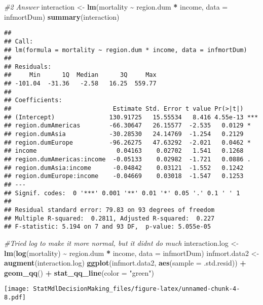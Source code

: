 \documentclass[
]{article}
\newenvironment{Shaded}{\begin{snugshade}}{\end{snugshade}}
\newcommand{\AttributeTok}[1]{\textcolor[rgb]{0.13,0.29,0.53}{#1}}
\newcommand{\CommentTok}[1]{\textcolor[rgb]{0.56,0.35,0.01}{\textit{#1}}}
\newcommand{\FunctionTok}[1]{\textcolor[rgb]{0.13,0.29,0.53}{\textbf{#1}}}
\newcommand{\NormalTok}[1]{#1}
\newcommand{\OtherTok}[1]{\textcolor[rgb]{0.56,0.35,0.01}{#1}}
\newcommand{\SpecialCharTok}[1]{\textcolor[rgb]{0.81,0.36,0.00}{\textbf{#1}}}
\newcommand{\StringTok}[1]{\textcolor[rgb]{0.31,0.60,0.02}{#1}}
\begin{document}
\begin{Shaded}
\begin{Highlighting}[]
\CommentTok{\#2 Answer}
\NormalTok{interaction }\OtherTok{\textless{}{-}} \FunctionTok{lm}\NormalTok{(mortality }\SpecialCharTok{\textasciitilde{}}\NormalTok{ region.dum }\SpecialCharTok{*}\NormalTok{ income, }\AttributeTok{data =}\NormalTok{ infmortDum)}
\FunctionTok{summary}\NormalTok{(interaction)}
\end{Highlighting}
\end{Shaded}

\begin{verbatim}
## 
## Call:
## lm(formula = mortality ~ region.dum * income, data = infmortDum)
## 
## Residuals:
##     Min      1Q  Median      3Q     Max 
## -101.04  -31.36   -2.58   16.25  559.77 
## 
## Coefficients:
##                            Estimate Std. Error t value Pr(>|t|)    
## (Intercept)               130.91725   15.55534   8.416 4.55e-13 ***
## region.dumAmericas        -66.30647   26.15577  -2.535   0.0129 *  
## region.dumAsia            -30.28530   24.14769  -1.254   0.2129    
## region.dumEurope          -96.26275   47.63292  -2.021   0.0462 *  
## income                      0.04163    0.02702   1.541   0.1268    
## region.dumAmericas:income  -0.05133    0.02982  -1.721   0.0886 .  
## region.dumAsia:income      -0.04842    0.03121  -1.552   0.1242    
## region.dumEurope:income    -0.04669    0.03018  -1.547   0.1253    
## ---
## Signif. codes:  0 '***' 0.001 '**' 0.01 '*' 0.05 '.' 0.1 ' ' 1
## 
## Residual standard error: 79.83 on 93 degrees of freedom
## Multiple R-squared:  0.2811, Adjusted R-squared:  0.227 
## F-statistic: 5.194 on 7 and 93 DF,  p-value: 5.055e-05
\end{verbatim}

\begin{Shaded}
\begin{Highlighting}[]
\CommentTok{\#Tried log to make it more normal, but it didn\textquotesingle{}t do much}
\NormalTok{interaction.log }\OtherTok{\textless{}{-}} \FunctionTok{lm}\NormalTok{(}\FunctionTok{log}\NormalTok{(mortality) }\SpecialCharTok{\textasciitilde{}}\NormalTok{ region.dum }\SpecialCharTok{*}\NormalTok{ income, }\AttributeTok{data =}\NormalTok{ infmortDum)}
\NormalTok{infmort.data2 }\OtherTok{\textless{}{-}} \FunctionTok{augment}\NormalTok{(interaction.log)}
\FunctionTok{ggplot}\NormalTok{(infmort.data2, }\FunctionTok{aes}\NormalTok{(}\AttributeTok{sample =}\NormalTok{ .std.resid)) }\SpecialCharTok{+}
\FunctionTok{geom\_qq}\NormalTok{() }\SpecialCharTok{+}
\FunctionTok{stat\_qq\_line}\NormalTok{(}\AttributeTok{color =} \StringTok{"green"}\NormalTok{) }
\end{Highlighting}
\end{Shaded}

\texttt{[image: StatMdlDecisionMaking\_files/figure-latex/unnamed-chunk-4-8.pdf]}
\end{document}
